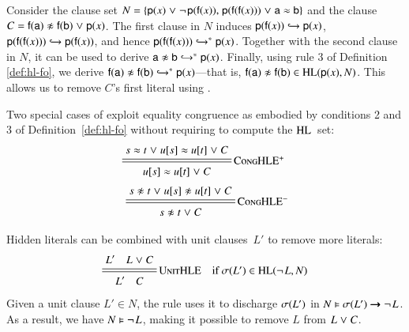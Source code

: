 \begin{exa}
   \label{example:hle}
   Consider the clause set $N = \{ \cst{p}(x) \cor \neglit{\cst{p}(\cst{f}(x))}{,}\;
   \cst{p}(\cst{f}(\cst{f}(x))) \cor \eqlit{\cst{a}}{\cst{b}} \}$ and the clause
   $C = \neqlit{\cst{f}(\cst{a})}{\cst{f}(\cst{b})} \cor \cst{p}(x)$. The first
   clause in $N$ induces $\cst{p}(\cst{f}(x)) \bigfimpl{N} {\cst{p}(x)}$,
   $\cst{p}(\cst{f}(\cst{f}(x))) \bigfimpl{N} \cst{p}(\cst{f}(x))$, and
   hence $\cst{p}(\cst{f}(\cst{f}(x))) \bigfimpl{N}^\ast  \cst{p}(x)$.
   Together with the second clause in $N$, it can be used to derive $\neqlit{\cst{a}}{\cst{b}}
   \bigfimpl{N}^\ast  \cst{p}(x)$. Finally, using rule 3 of Definition
   \ref{def:hl-fo}, we derive $\neqlit{\cst{f}(\cst{a})}{\cst{f}(\cst{b})}
   \bigfimpl{N}^\ast  \cst{p}(x)$---that is,
   $\neqlit{\cst{f}(\cst{a})}{\cst{f}(\cst{b})} \in \HL(\cst{p}(x), N)$. This
   allows us to remove $C$'s first literal using .
\end{exa}

Two special cases of  exploit equality congruence as embodied by
conditions 2 and 3 of Definition~\ref{def:hl-fo} without requiring to
compute the $\HL$~set:
\begin{align*}
  \namedsimp{CongHLE$^+$}{\eqlit{s}{t} \cor \eqlit{u[s]}{u[t]} \cor C}{\eqlit{u[s]}{u[t]} \cor C}\,\, \\[.5\jot]
  \namedsimp{CongHLE$^-$}{\neqlit{s}{t} \cor \neqlit{u[s]}{u[t]} \cor C}{\neqlit{s}{t} \cor C}
\end{align*}%

Hidden literals can be combined with unit clauses~$L'$ to remove more literals:
\[\namedsimpsc{UnitHLE}{L' \quad L \cor C}{L' \quad C}{\sigmaterm{L'} \in \HL(\neglit{L},N)}
\]
%
Given a unit clause $L' \in N$, the rule uses it to discharge $\sigmaterm{L'}$ in
$N \models \sigmaterm{L'} \impl \neglit{L}$. As a result, we have $N \models
\neglit{L}$, making it possible to remove $L$ from $L \cor C$.


